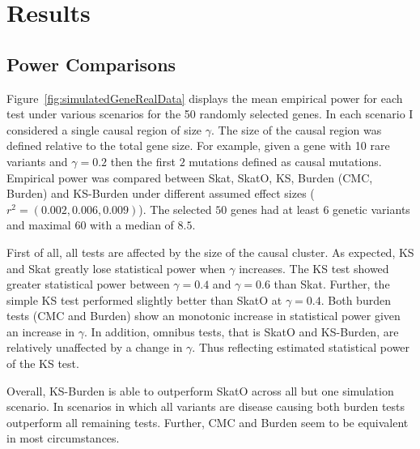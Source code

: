 \section{Results}
\label{sec:results}

\subsection{Power Comparisons}
\label{sub:power_comparisons}

Figure~\ref{fig:simulatedGeneRealData} displays the mean empirical power for each test under various scenarios for the 50 randomly selected genes.
In each scenario I considered a single causal region of size $\gamma$.
The size of the causal region was defined relative to the total gene size.
For example, given a gene with 10 rare variants and $\gamma=0.2$ then the first $2$ mutations defined as causal mutations.
Empirical power was compared between Skat, SkatO, KS, Burden (CMC, Burden) and KS-Burden under different assumed effect sizes ($r^2=(0.002, 0.006, 0.009)$).
The selected $50$ genes had at least $6$ genetic variants and maximal $60$ with a  median of $8.5$.

First of all, all tests are affected by the size of the causal cluster.
As expected, KS and Skat greatly lose statistical power when $\gamma$ increases.
The KS test showed greater statistical power between $\gamma=0.4$ and $\gamma=0.6$ than Skat.
Further, the simple KS test performed slightly better than SkatO at $\gamma=0.4$.
Both burden tests (CMC and Burden) show an monotonic increase in statistical power given an increase in $\gamma$.
In addition, omnibus tests, that is SkatO and KS-Burden, are relatively unaffected by a change in $\gamma$.
Thus reflecting estimated statistical power of the KS test.

Overall, KS-Burden is able to outperform SkatO across all but one simulation scenario.
In scenarios in which all variants are disease causing both burden tests outperform all remaining tests.
Further, CMC and Burden seem to be equivalent in most circumstances.

